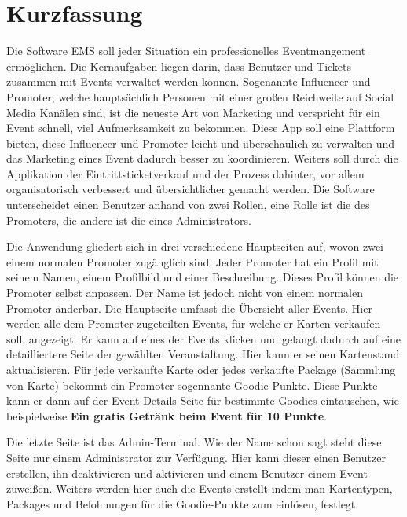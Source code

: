 \chapter{Kurzfassung}
Die Software EMS soll jeder Situation ein professionelles Eventmangement ermöglichen.
Die Kernaufgaben liegen darin, dass Benutzer und Tickets zusammen mit Events verwaltet werden können.
Sogenannte Influencer und Promoter, welche hauptsächlich Personen mit einer großen Reichweite auf Social Media Kanälen sind, ist die neueste Art von Marketing und verspricht für ein Event schnell, viel Aufmerksamkeit zu bekommen.
Diese App soll eine Plattform bieten, diese Influencer und Promoter leicht und überschaulich zu verwalten und das Marketing eines Event dadurch besser zu koordinieren.
Weiters soll durch die Applikation der Eintrittsticketverkauf und der Prozess dahinter, vor allem organisatorisch verbessert und übersichtlicher gemacht werden. 
Die Software unterscheidet einen Benutzer anhand von zwei Rollen, eine Rolle ist die des Promoters, die andere ist die eines Administrators.

Die Anwendung gliedert sich in drei verschiedene Hauptseiten auf, wovon zwei einem normalen Promoter zugänglich sind.
Jeder Promoter hat ein Profil mit seinem Namen, einem Profilbild und einer Beschreibung. Dieses Profil können die Promoter selbst anpassen. Der Name ist jedoch nicht von einem normalen Promoter änderbar.
Die Hauptseite umfasst die Übersicht aller Events. Hier werden alle dem Promoter zugeteilten Events, für welche er Karten verkaufen soll, angezeigt.
Er kann auf eines der Events klicken und gelangt dadurch auf eine detailliertere Seite der gewählten Veranstaltung.
Hier kann er seinen Kartenstand aktualisieren. Für jede verkaufte Karte oder jedes verkaufte Package (Sammlung von Karte) bekommt ein Promoter sogennante Goodie-Punkte.
Diese Punkte kann er dann auf der Event-Details Seite für bestimmte Goodies eintauschen, wie beispielweise \textbf{Ein gratis Getränk beim Event für 10 Punkte}.

Die letzte Seite ist das Admin-Terminal. Wie der Name schon sagt steht diese Seite nur einem Administrator zur Verfügung.
Hier kann dieser einen Benutzer erstellen, ihn deaktivieren und aktivieren und einem Benutzer einem Event zuweißen.
Weiters werden hier auch die Events erstellt indem man Kartentypen, Packages und Belohnungen für die Goodie-Punkte zum einlösen, festlegt.